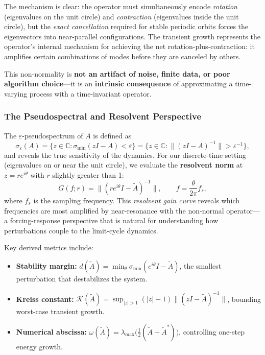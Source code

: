 \documentclass[12pt]{article}
\newcommand{\C}{\mathbb{C}}
\newcommand{\norm}[1]{\lVert #1 \rVert}
\newcommand{\abs}[1]{\lvert #1 \rvert}
\newcommand{\Atilde}{\tilde{A}}
\begin{document}
The mechanism is clear: the operator must simultaneously encode
\emph{rotation} (eigenvalues on the unit circle) and \emph{contraction}
(eigenvalues inside the unit circle), but the \emph{exact cancellation}
required for stable periodic orbits forces the eigenvectors into near-parallel
configurations. The transient growth represents the operator's internal
mechanism for achieving the net rotation-plus-contraction: it amplifies
certain combinations of modes before they are canceled by others.

This non-normality is \textbf{not an artifact of noise, finite data, or
poor algorithm choice}---it is an \textbf{intrinsic consequence} of
approximating a time-varying process with a time-invariant operator.

\subsubsection{The Pseudospectral and Resolvent Perspective}
\label{sec:pseudospectra_theory}

The $\varepsilon$-pseudospectrum of $A$ is defined as
\begin{equation}
  \sigma_\varepsilon(A) = \{z \in \C : \sigma_{\min}(zI - A) < \varepsilon\}
  = \{z \in \C : \norm{(zI - A)^{-1}} > \varepsilon^{-1}\},
\end{equation}
and reveals the true sensitivity of the dynamics. For our discrete-time
setting (eigenvalues on or near the unit circle), we evaluate the
\textbf{resolvent norm} at $z = r e^{i\theta}$ with $r$ slightly greater
than 1:
\begin{equation}
  G(f; r) = \norm{(re^{i\theta} I - \Atilde)^{-1}}, \qquad
  f = \frac{\theta}{2\pi} f_s,
  \label{eq:resolvent_gain}
\end{equation}
where $f_s$ is the sampling frequency. This \emph{resolvent gain curve}
reveals which frequencies are most amplified by near-resonance with the
non-normal operator---a forcing-response perspective that is natural for
understanding how perturbations couple to the limit-cycle dynamics.

Key derived metrics include:
\begin{itemize}
  \item \textbf{Stability margin:}
  $d(\Atilde) = \min_\theta \sigma_{\min}(e^{i\theta}I - \Atilde)$,
  the smallest perturbation that destabilizes the system.
  \item \textbf{Kreiss constant:}
  $\mathcal{K}(\Atilde) = \sup_{\abs{z}>1} (\abs{z}-1)\norm{(zI-\Atilde)^{-1}}$,
  bounding worst-case transient growth.
  \item \textbf{Numerical abscissa:}
  $\omega(\Atilde) = \lambda_{\max}\!\bigl(\tfrac{1}{2}(\Atilde + \Atilde^*)\bigr)$,
  controlling one-step energy growth.
\end{itemize}
\end{document}

